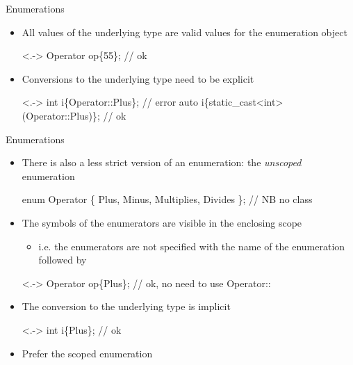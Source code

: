 \begin{frame}[fragile]{Enumerations \insertcontinuationtext}

  \begin{itemize}[<+->]
  \item All values of the underlying type are valid values for the enumeration
    object

    \begin{codeblock}<.->
Operator op\{55\};  // ok\end{codeblock}

  \item Conversions to the underlying type need to be explicit

    \begin{codeblock}<.->
int i\{Operator::Plus\};                     // error
auto i\{static_cast<int>(Operator::Plus)\};  // ok\end{codeblock}

  \end{itemize}

\end{frame}

\begin{frame}[fragile]{Enumerations \insertcontinuationtext}

  \begin{itemize}[<+->]
  \item There is also a less strict version of an enumeration: the
    \textit{unscoped} enumeration
    \begin{codeblock}
enum Operator \{ Plus, Minus, Multiplies, Divides \}; // NB no class\end{codeblock}

  \item The symbols of the enumerators are visible in the enclosing scope
    \begin{itemize}[<.->]
    \item i.e. the enumerators are not specified with the name of the
      enumeration followed by \code{::}
    \end{itemize}

    \begin{codeblock}<.->
Operator op\{Plus\};  // ok, no need to use Operator::
\end{codeblock}

  \item The conversion to the underlying type is implicit
    \begin{codeblock}<.->
int i\{Plus\};  // ok\end{codeblock}

  \item Prefer the scoped enumeration

  \end{itemize}

\end{frame}

